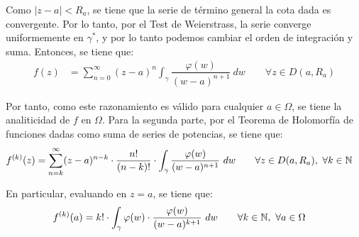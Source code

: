 \begin{ejercicio}
    Como $|z-a|<R_a$, se tiene que la serie de término general la cota dada es convergente. Por lo tanto, por el Test de Weierstrass, la serie converge uniformemente en $\gamma^*$, y por lo tanto podemos cambiar el orden de integración y suma. Entonces, se tiene que:
    \begin{align*}
        f(z) &= \sum_{n=0}^{\infty} (z-a)^n \int_{\gamma} \dfrac{\varphi(w)}{(w-a)^{n+1}}\ dw
        \qquad \forall z\in D(a,R_a)
    \end{align*}

    Por tanto, como este razonamiento es válido para cualquier $a\in \Omega$, se tiene la analiticidad de $f$ en $\Omega$. Para la segunda parte, por el Teorema de Holomorfía de funciones dadas como suma de series de potencias, se tiene que:
    \begin{align*}
        f^{(k)}(z) &= \sum_{n=k}^{\infty} (z-a)^{n-k}\cdot \dfrac{n!}{(n-k)!}\cdot \int_{\gamma} \dfrac{\varphi(w)}{(w-a)^{n+1}}\ dw
        \qquad \forall z\in D(a,R_a),\ \forall k\in \bb{N}
    \end{align*}

    En particular, evaluando en $z=a$, se tiene que:
    \begin{align*}
        f^{(k)}(a) &= k!\cdot \int_{\gamma} \varphi(w)\cdot \dfrac{\varphi(w)}{(w-a)^{k+1}}\ dw\qquad \forall k\in \mathbb{N},\ \forall a\in \Omega
    \end{align*}
\end{ejercicio}

